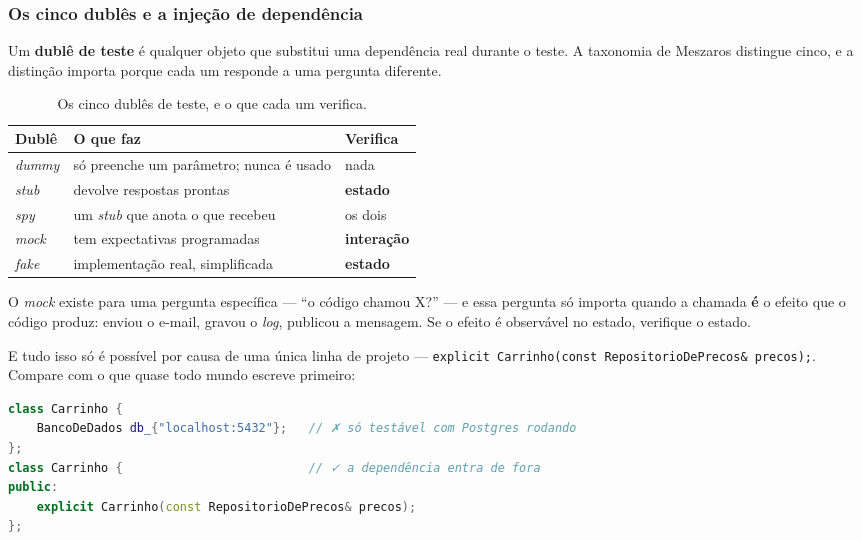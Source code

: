 \subsubsection{Os cinco dublês e a injeção de dependência}

Um \textbf{dublê de teste} é qualquer objeto que substitui uma dependência real
durante o teste. A taxonomia de Meszaros distingue cinco, e a distinção importa
porque cada um responde a uma pergunta diferente.

\begin{table}[htbp]
\centering
\caption{Os cinco dublês de teste, e o que cada um verifica.}
\label{tab:dubles}
\footnotesize
\begin{tabular}{@{}lll@{}}
\toprule
\textbf{Dublê} & \textbf{O que faz} & \textbf{Verifica} \\
\midrule
\emph{dummy} & só preenche um parâmetro; nunca é usado & nada \\
\emph{stub}  & devolve respostas prontas               & \textbf{estado} \\
\emph{spy}   & um \emph{stub} que anota o que recebeu  & os dois \\
\emph{mock}  & tem expectativas programadas            & \textbf{interação} \\
\emph{fake}  & implementação real, simplificada        & \textbf{estado} \\
\bottomrule
\end{tabular}
\end{table}

\begin{regra}
O \emph{mock} existe para uma pergunta específica --- ``o código chamou X?'' --- e
essa pergunta só importa quando a chamada \textbf{é} o efeito que o código
produz: enviou o e-mail, gravou o \emph{log}, publicou a mensagem. Se o efeito é
observável no estado, verifique o estado.
\end{regra}

E tudo isso só é possível por causa de uma única linha de projeto ---
\texttt{explicit Carrinho(const RepositorioDePrecos\& precos);}. Compare com o
que quase todo mundo escreve primeiro:

\begin{lstlisting}[style=bt, language=C++,
    caption={A dependência construída por dentro contra a dependência injetada.}]
class Carrinho {
    BancoDeDados db_{"localhost:5432"};   // ✗ só testável com Postgres rodando
};
class Carrinho {                          // ✓ a dependência entra de fora
public:
    explicit Carrinho(const RepositorioDePrecos& precos);
};
\end{lstlisting}

